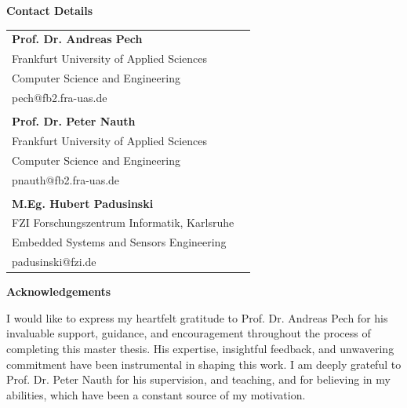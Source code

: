 {%
\begin{titlepage}
	\vspace*{\fill}
    \begin{center}
    {\Large\textbf{Contact Details}} \\ \vspace{4em}
    \begin{tabular}{@{}ll@{}}
    \textbf{Prof. Dr. Andreas Pech} & \\
    Frankfurt University of Applied Sciences & \\
    Computer Science and Engineering & \\
    pech@fb2.fra-uas.de & \\
    \vspace{0.5em} \\
    \textbf{Prof. Dr. Peter Nauth} & \\
    Frankfurt University of Applied Sciences & \\
    Computer Science and Engineering & \\
    pnauth@fb2.fra-uas.de & \\
    \vspace{0.5em} \\
    \textbf{M.Eg. Hubert Padusinski} & \\
    FZI Forschungszentrum Informatik, Karlsruhe & \\
    Embedded Systems and Sensors Engineering & \\
    padusinski@fzi.de & \\
    \end{tabular}
    \end{center}
    \vspace*{\fill}
\end{titlepage}


\begin{titlepage}
	\vspace*{\fill}
	{\Large\textbf{Acknowledgements}\par}\bigskip%
    I would like to express my heartfelt gratitude to Prof. Dr. Andreas Pech for his invaluable support, guidance, and encouragement throughout the process of completing this master thesis. His expertise, insightful feedback, and unwavering commitment have been instrumental in shaping this work. I am deeply grateful to Prof. Dr. Peter Nauth for his supervision, and teaching, and for believing in my abilities, which have been a constant source of my motivation.
    

\end{titlepage}}
